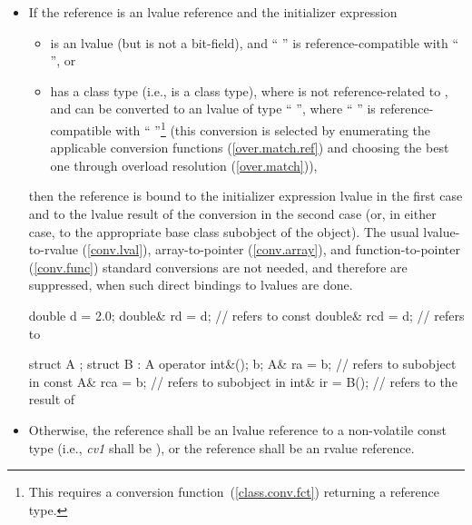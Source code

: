 \begin{itemize}
\item
If the reference is an lvalue reference and the initializer expression

\begin{itemize}
\item
is an lvalue (but is not a
bit-field), and
`` '' is reference-compatible with
`` '', or
\item
has a class type (i.e.,
is a class type), where  is not reference-related to , and can be converted
to an lvalue of type `` '', where
`` '' is reference-compatible with
`` ''\footnote{This requires a conversion
function~(\ref{class.conv.fct}) returning a reference type.}
(this conversion is selected by enumerating the applicable conversion
functions (\ref{over.match.ref}) and choosing the best one through overload
resolution (\ref{over.match})),
\end{itemize}
then the reference is bound to the initializer expression lvalue in the
first case and to the lvalue result of the conversion
in the second case (or, in either case, to the appropriate base class subobject of the object).
\enternote
The usual lvalue-to-rvalue (\ref{conv.lval}), array-to-pointer
(\ref{conv.array}), and function-to-pointer (\ref{conv.func}) standard
conversions are not needed, and therefore are suppressed, when such
direct bindings to lvalues are done.
\exitnote

\enterexample

\begin{codeblock}
double d = 2.0;
double& rd = d;                 //  refers to 
const double& rcd = d;          //  refers to 

struct A { };
struct B : A { operator int&(); } b;
A& ra = b;                      //  refers to  subobject in 
const A& rca = b;               //  refers to  subobject in 
int& ir = B();                  //  refers to the result of 
\end{codeblock}
\exitexample

\item
Otherwise, the reference shall be an lvalue reference to a non-volatile
const type (i.e.,
\textit{cv1}
shall be
), or the reference shall be an rvalue reference.
\enterexample


\end{itemize}
